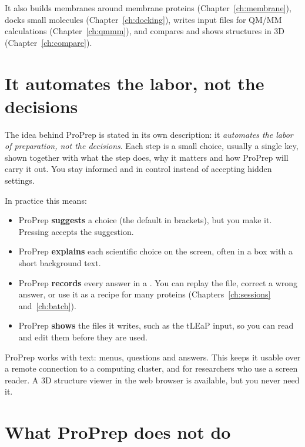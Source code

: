 It also builds membranes around membrane proteins (Chapter~\ref{ch:membrane}),
docks small molecules (Chapter~\ref{ch:docking}), writes input files for
QM/MM calculations (Chapter~\ref{ch:qmmm}), and compares and shows structures
in 3D (Chapter~\ref{ch:compare}).

\section{It automates the labor, not the decisions}
\label{sec:whatis-idea}

The idea behind ProPrep is stated in its own description: it \emph{automates
the labor of preparation, not the decisions}. Each step is a small choice,
usually a single key, shown together with what the step does, why it matters
and how ProPrep will carry it out. You stay informed and in control instead of
accepting hidden settings.

In practice this means:
\begin{itemize}
  \item ProPrep \textbf{suggests} a choice (the default in brackets), but you
        make it. Pressing  accepts the suggestion.
  \item ProPrep \textbf{explains} each scientific choice on the screen, often in
        a box with a short background text.
  \item ProPrep \textbf{records} every answer in a . You
        can replay the file, correct a wrong answer, or use it as a recipe for
        many proteins (Chapters~\ref{ch:sessions} and~\ref{ch:batch}).
  \item ProPrep \textbf{shows} the files it writes, such as the tLEaP input, so
        you can read and edit them before they are used.
\end{itemize}

ProPrep works with text: menus, questions and answers. This keeps it usable
over a remote connection to a computing cluster, and for researchers who use a
screen reader. A 3D structure viewer in the web browser is available, but you
never need it.

\section{What ProPrep does not do}
\label{sec:whatis-not}

